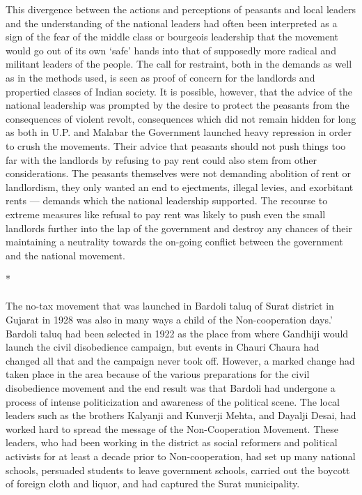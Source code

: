 This divergence between the actions and perceptions of peasants and local leaders and the understanding of the national leaders had often been interpreted as a sign of the fear of the middle class or bourgeois leadership that the movement would go out of its own `safe' hands into that of supposedly more radical and militant leaders of the people. The call for restraint, both in the demands as well as in the methods used, is seen as proof of concern for the landlords and propertied classes of Indian society. It is possible, however, that the advice of the national leadership was prompted by the desire to protect the peasants from the consequences of violent revolt, consequences which did not remain hidden for long as both in U.P. and Malabar the Government launched heavy repression in order to crush the movements. Their advice that peasants should not push things too far with the landlords by refusing to pay rent could also stem from other considerations. The peasants themselves were not demanding abolition of rent or landlordism, they only wanted an end to ejectments, illegal levies, and exorbitant rents --- demands which the national leadership supported. The recourse to extreme measures like refusal to pay rent was likely to push even the small landlords further into the lap of the government and destroy any chances of their maintaining a neutrality towards the on-going conflict between the government and the national movement.

\begin{center}*\end{center}

\paragraph*{}


The no-tax movement that was launched in Bardoli taluq of Surat district in Gujarat in 1928 was also in many ways a child of the Non-cooperation days.' Bardoli taluq had been selected in 1922 as the place from where Gandhiji would launch the civil disobedience campaign, but events in Chauri Chaura had changed all that and the campaign never took off. However, a marked change had taken place in the area because of the various preparations for the civil disobedience movement and the end result was that Bardoli had undergone a process of intense politicization and awareness of the political scene. The local leaders such as the brothers Kalyanji and Kunverji Mehta, and Dayalji Desai, had worked hard to spread the message of the Non-Cooperation Movement. These leaders, who had been working in the district as social reformers and political activists for at least a decade prior to Non-cooperation, had set up many national schools, persuaded students to leave government schools, carried out the boycott of foreign cloth and liquor, and had captured the Surat municipality.

